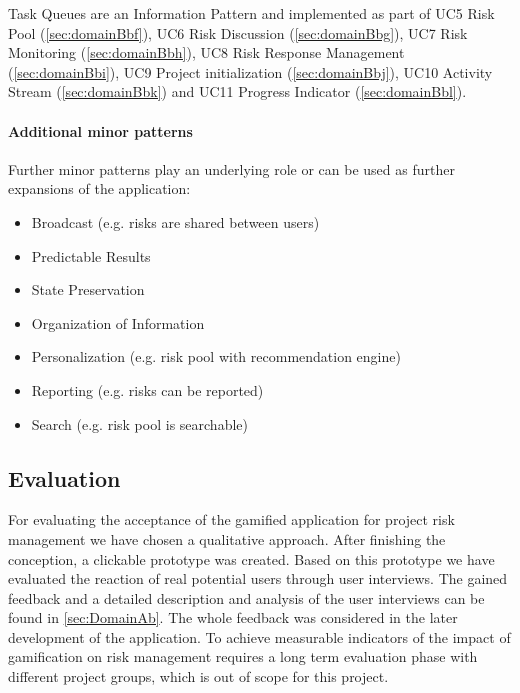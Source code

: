 Task Queues are an Information Pattern and implemented as part of \ac{UC}5 Risk Pool (\ref{sec:domainBbf}), \ac{UC}6 Risk Discussion (\ref{sec:domainBbg}), \ac{UC}7 Risk Monitoring (\ref{sec:domainBbh}), \ac{UC}8 Risk Response Management (\ref{sec:domainBbi}), \ac{UC}9 Project initialization (\ref{sec:domainBbj}), \ac{UC}10 Activity Stream (\ref{sec:domainBbk}) and \ac{UC}11 Progress Indicator (\ref{sec:domainBbl}).

\paragraph*{Additional minor patterns}
Further minor patterns play an underlying role or can be used as further expansions of the application:
\begin{itemize}
	\item Broadcast (e.g. risks are shared between users)
	\item Predictable Results
	\item State Preservation
	\item Organization of Information
	\item Personalization (e.g. risk pool with recommendation engine)
	\item Reporting (e.g. risks can be reported)
	\item Search (e.g. risk pool is searchable)
\end{itemize}


\subsection{Evaluation}
\label{sec:domainCd}


For evaluating the acceptance of the gamified application for project risk management we have chosen a qualitative approach. After finishing the conception, a clickable prototype was created. Based on this prototype we have evaluated the reaction of real potential users through user interviews. The gained feedback and a detailed description and analysis of the user interviews can be found in \ref{sec:DomainAb}.
The whole feedback was considered in the later development of the application. To achieve measurable indicators of the impact of gamification on risk management requires a long term evaluation phase with different project groups, which is out of scope for this project.